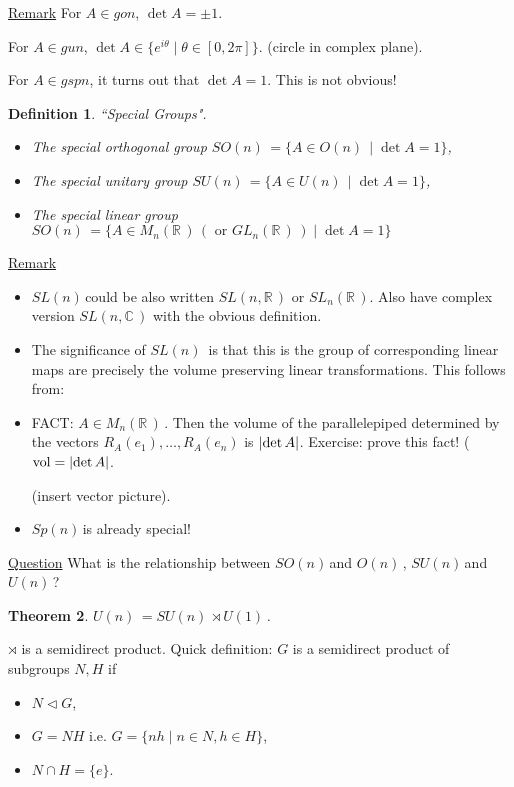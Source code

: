\documentclass[12pt,a4paper]{article}
\newcommand{\rR}{\ensuremath{\mathbb{R}\,}}
\newcommand{\cC}{\ensuremath{\mathbb{C}\,}}
\newcommand{\mnr}{\ensuremath{M_n(\rR)\,}}
\newcommand{\glnr}{\ensuremath{GL_n(\rR)\,}}
\newcommand{\gon}{\ensuremath{O(n)\,}}
\newcommand{\gun}{\ensuremath{U(n)\,}}
\newcommand{\gspn}{\ensuremath{Sp(n)\,}}
\newcommand{\guk}[1]{\ensuremath{U(#1)\,}}
\newcommand{\gson}{\ensuremath{SO(n)\,}}
\newcommand{\gsun}{\ensuremath{SU(n)\,}}
\newcommand{\gsln}{\ensuremath{SL(n)\,}}
\newcommand{\ul}[1]{\underline{#1}}
\newtheorem{thm}{Theorem}[subsubsection]
\newtheorem{defn}[thm]{Definition}
\begin{document}
\ul{Remark} For $A\in gon$, $\det A =\pm 1$. 

For $A\in gun$, $\det A \in \{e^{i\theta}\mid \theta \in [0,2\pi]\}.$ (circle in complex plane).

For $A\in gspn$, it turns out that $\det A=1$. This is not obvious!

\begin{defn}
``Special Groups".\\

\begin{itemize}
\item[1)] The special orthogonal group $\gson = \{A\in \gon\mid \det A=1\}$,
\item[2)] The special unitary group $\gsun = \{A\in \gun\mid \det A=1\}$,
\item[3)] The special linear group $\gson = \{A\in \mnr (\text{ or } \glnr)\mid \det A=1\}$
\end{itemize}
\end{defn}

\ul{Remark}
\begin{itemize}
\item[1.] \gsln could be also written $SL(n,\rR)$ or $SL_n(\rR)$. Also have complex version $SL(n,\cC)$ with the obvious definition.
\item[2.] The significance of $\gsln$ is that this is the group of corresponding linear maps are precisely the volume preserving linear transformations. This follows from:
\item[3.] FACT: $A\in \mnr$. Then the volume of the parallelepiped determined by the vectors $R_A(e_1),\ldots,R_A(e_n)$ is $\abs{\det A}$. Exercise: prove this fact! ($\mathrm{vol}=\abs{\det A}$.

(insert vector picture).
\item[4.] \gspn is already special!
\end{itemize}

\ul{Question} What is the relationship between \gson and \gon, \gsun and \gun ?

\begin{thm}
$\gun = \gsun \rtimes \guk{1}$.
\end{thm}

$\rtimes$ is a semidirect product. Quick definition: $G$ is a semidirect product of subgroups $N,H$ if 
\begin{itemize}
\item[1)] $N\lhd G$,
\item[2)] $G=NH$ i.e. $G=\{nh\mid n\in N, h\in H\}$,
\item[1)] $N\cap H =\{e\}$.
\end{itemize}
\end{document}
